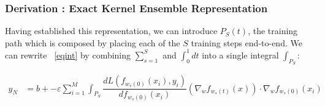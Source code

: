 \begin{frame}
  \frametitle{Derivation : Exact Kernel Ensemble Representation}

Having established this representation, we can introduce $P_S(t)$, the
training path which is composed by placing each of the $S$ training
steps end-to-end. We can rewrite ~\ref{eqint} by combining $\sum_{s =
  1}^S$ and $\int_0^1 dt$ into a single integral $\int_{P_S}$:

\begin{align}
y_N &= b +  -\varepsilon \sum_{i = 1}^{M} \int_{P_S} \dfrac{d
      L(f_{w_s(0)}(x_i),  y_i)}{d f_{w_s(0)}(x_i)}
      \left(\nabla_w f_{w_s(t)}(x)\right) \cdot \nabla_w
      f_{w_s(0)}(x_i)   
\end{align}
\end{frame}


